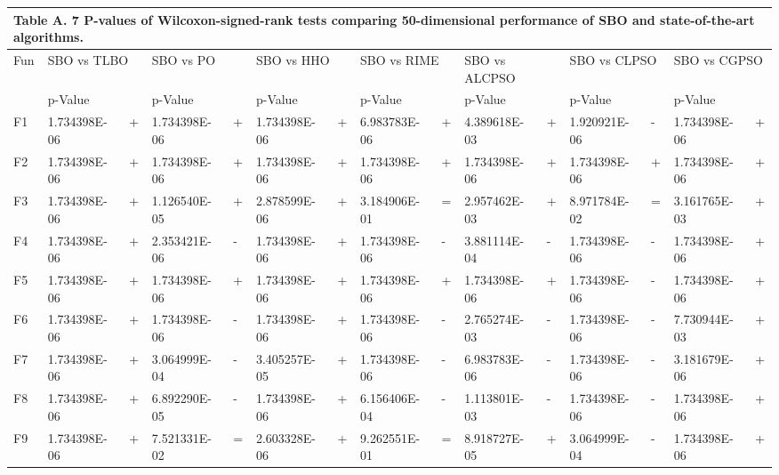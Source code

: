 \documentclass{article} %
\begin{document}
\begin{tabular}{|p{0.3in}|p{0.5in}|p{0.2in}|p{0.5in}|p{0.2in}|p{0.6in}|p{0.1in}|p{0.6in}|p{0.1in}|p{0.5in}|p{0.1in}|p{0.5in}|p{0.1in}|p{0.5in}|p{0.2in}|} \hline 
\multicolumn{15}{|p{1in}|}{\textbf{Table A. }7\textbf{ }P-values of Wilcoxon-signed-rank tests comparing 50-dimensional performance of SBO and state-of-the-art algorithms.\textbf{}} \\ \hline 
Fun & \multicolumn{2}{|p{0.7in}|}{SBO vs TLBO} & \multicolumn{2}{|p{0.7in}|}{SBO vs PO} & \multicolumn{2}{|p{0.7in}|}{SBO vs HHO} & \multicolumn{2}{|p{0.7in}|}{SBO vs RIME} & \multicolumn{2}{|p{0.7in}|}{SBO vs ALCPSO} & \multicolumn{2}{|p{0.7in}|}{SBO vs CLPSO} & \multicolumn{2}{|p{0.7in}|}{SBO vs CGPSO} \\ \hline 
 & p-Value &  & p-Value &  & p-Value &  & p-Value &  & p-Value &  & p-Value &  & p-Value &  \\ \hline 
F1 & 1.734398E-06 & + & 1.734398E-06 & + & 1.734398E-06 & + & 6.983783E-06 & + & 4.389618E-03 & + & 1.920921E-06 & - & 1.734398E-06 & + \\ \hline 
F2 & 1.734398E-06 & + & 1.734398E-06 & + & 1.734398E-06 & + & 1.734398E-06 & + & 1.734398E-06 & + & 1.734398E-06 & + & 1.734398E-06 & + \\ \hline 
F3 & 1.734398E-06 & + & 1.126540E-05 & + & 2.878599E-06 & + & 3.184906E-01 & = & 2.957462E-03 & + & 8.971784E-02 & = & 3.161765E-03 & + \\ \hline 
F4 & 1.734398E-06 & + & 2.353421E-06 & - & 1.734398E-06 & + & 1.734398E-06 & - & 3.881114E-04 & - & 1.734398E-06 & - & 1.734398E-06 & + \\ \hline 
F5 & 1.734398E-06 & + & 1.734398E-06 & + & 1.734398E-06 & + & 1.734398E-06 & + & 1.734398E-06 & + & 1.734398E-06 & - & 1.734398E-06 & + \\ \hline 
F6 & 1.734398E-06 & + & 1.734398E-06 & - & 1.734398E-06 & + & 1.734398E-06 & - & 2.765274E-03 & - & 1.734398E-06 & - & 7.730944E-03 & + \\ \hline 
F7 & 1.734398E-06 & + & 3.064999E-04 & - & 3.405257E-05 & + & 1.734398E-06 & - & 6.983783E-06 & - & 1.734398E-06 & - & 3.181679E-06 & + \\ \hline 
F8 & 1.734398E-06 & + & 6.892290E-05 & - & 1.734398E-06 & + & 6.156406E-04 & - & 1.113801E-03 & - & 1.734398E-06 & - & 1.734398E-06 & + \\ \hline 
F9 & 1.734398E-06 & + & 7.521331E-02 & = & 2.603328E-06 & + & 9.262551E-01 & = & 8.918727E-05 & + & 3.064999E-04 & - & 1.734398E-06 & + \\ \hline 

\end{tabular}
\end{document}

